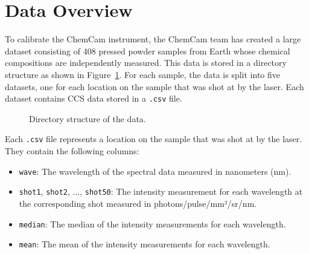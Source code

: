 \section{Data Overview}\label{sec:data_overview}
To calibrate the ChemCam instrument, the ChemCam team has created a large dataset consisting of 408 pressed powder samples from Earth whose chemical compositions are independently measured\cite{cleggRecalibrationMarsScience2017}.
This data is stored in a directory structure as shown in Figure~\ref{fig:directory_structure}.
For each sample, the data is split into five datasets, one for each location on the sample that was shot at by the laser.
Each dataset contains CCS data stored in a \texttt{.csv} file.

\begin{figure}[ht]
\caption{Directory structure of the data.}
\label{fig:directory_structure}
\end{figure}


Each \texttt{.csv} file represents a location on the sample that was shot at by the laser.
They contain the following columns:

\begin{itemize}
    \item \texttt{wave}: The wavelength of the spectral data measured in nanometers (nm).
    \item \texttt{shot1}, \texttt{shot2}, ..., \texttt{shot50}: The intensity measurement for each wavelength at the corresponding shot measured in photons/pulse/mm²/sr/nm.
    \item \texttt{median}: The median of the intensity measurements for each wavelength.
    \item \texttt{mean}: The mean of the intensity measurements for each wavelength.
\end{itemize}

